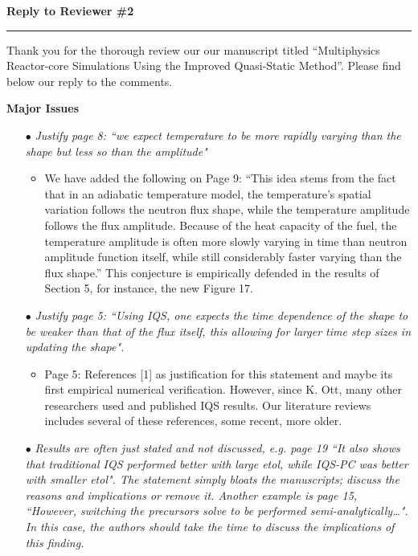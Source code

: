 \documentclass[11pt]{letter}
\newcommand{\iqspc}{IQS-PC\xspace}
\newcommand{\section}[1]{\textbf{#1}}
\newcommand{\working}{$\bullet$}
\newcommand{\done}{$\bullet$}
\newcommand{\easy}[1]{{\textit{#1}}}
\newcommand{\medm}[1]{{\textit{#1}}}
\begin{document}


\large{\textbf{Reply to Reviewer \#2}}\hrule\small

Thank you for the thorough review our our manuscript titled ``Multiphysics Reactor-core Simulations Using the Improved Quasi-Static Method''. Please find below our reply to the comments.


\section{Major Issues}

\begin{itemize}

\item[\done] \medm{ Justify page 8: ``we expect temperature to be more rapidly varying than the shape but less so than the amplitude" }
\begin{itemize}
\item We have added the following on Page 9: ``This idea stems from the fact that in an adiabatic temperature model, the temperature's spatial variation follows the neutron flux shape, while the temperature amplitude follows the flux amplitude. Because of the heat capacity of the fuel, the temperature amplitude is often more slowly varying in time than neutron amplitude function itself, while still considerably faster varying than the flux shape.'' This conjecture is empirically defended in the results of Section 5, for instance, the new Figure 17.
\end{itemize}

\item[\done] \easy{ Justify page 5: ``Using IQS, one expects the time dependence of the shape to be weaker than that of the flux itself, this allowing for larger time step sizes in updating the shape". }
\begin{itemize}
\item Page 5: References [1] as justification for this statement and maybe its first empirical numerical verification. However, since K. Ott, many other researchers used and published IQS results. Our literature reviews includes several of these references, some recent, more older.
\end{itemize}

\item[\working] \medm{  Results are often just stated and not discussed, e.g. page 19 ``It also shows that traditional IQS performed better with large etol, while \iqspc was better with smaller etol". The statement simply bloats the manuscripts; discuss the reasons and implications or remove it. Another example is page 15, ``However, switching the precursors solve to be performed semi-analytically…".  In this case, the authors should take the time to discuss the implications of this finding. }


\end{itemize}
\end{document}
